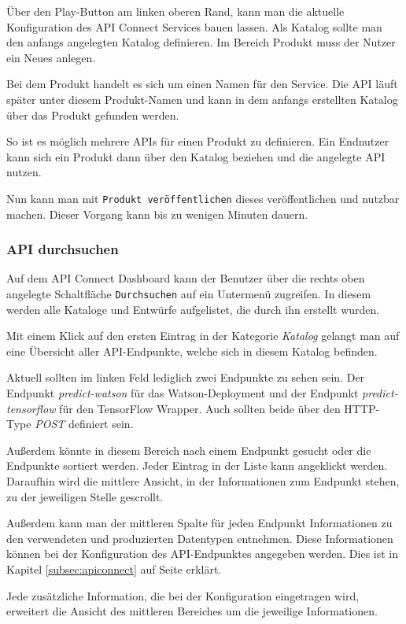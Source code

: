 Über den Play-Button am linken oberen Rand, kann man die aktuelle Konfiguration des API Connect Services bauen lassen.
Als Katalog sollte man den anfangs angelegten Katalog definieren. Im Bereich Produkt muss der Nutzer ein Neues anlegen.

Bei dem Produkt handelt es sich um einen Namen für den Service. Die API läuft später unter diesem Produkt-Namen und kann
in dem anfangs erstellten Katalog über das Produkt gefunden werden.

So ist es möglich mehrere APIs für einen Produkt zu definieren. Ein Endnutzer kann sich ein Produkt dann über den Katalog
beziehen und die angelegte API nutzen.

Nun kann man mit \texttt{Produkt veröffentlichen} dieses veröffentlichen und nutzbar machen. Dieser Vorgang kann bis zu
wenigen Minuten dauern.

\subsubsection{API durchsuchen}
Auf dem API Connect Dashboard kann der Benutzer über die rechts oben angelegte Schaltfläche \texttt{Durchsuchen} auf ein
Untermenü zugreifen. In diesem werden alle Kataloge und Entwürfe aufgelistet, die durch ihn erstellt wurden.

Mit einem Klick auf den ersten Eintrag in der Kategorie \textit{Katalog} gelangt man auf eine Übersicht aller
API-Endpunkte, welche sich in diesem Katalog befinden.

Aktuell sollten im linken Feld lediglich zwei Endpunkte zu sehen sein. Der Endpunkt \textit{predict-watson} für das
Watson-Deployment und der Endpunkt \textit{predict-tensorflow} für den TensorFlow Wrapper. Auch sollten beide über
den HTTP-Type \textit{POST} definiert sein.

Außerdem könnte in diesem Bereich nach einem Endpunkt gesucht oder die Endpunkte sortiert werden. Jeder Eintrag in der Liste
kann angeklickt werden. Daraufhin wird die mittlere Ansicht, in der Informationen zum Endpunkt stehen, zu der jeweiligen
Stelle gescrollt.

Außerdem kann man der mittleren Spalte für jeden Endpunkt Informationen zu den verwendeten und produzierten Datentypen
entnehmen. Diese Informationen können bei der Konfiguration des API-Endpunktes angegeben werden. Dies ist in Kapitel
\ref{subsec:apiconnect} auf Seite \pageref{subsec:apiconnect} erklärt.

Jede zusätzliche Information, die bei der Konfiguration eingetragen wird, erweitert die Ansicht des mittleren Bereiches
um die jeweilige Informationen.

